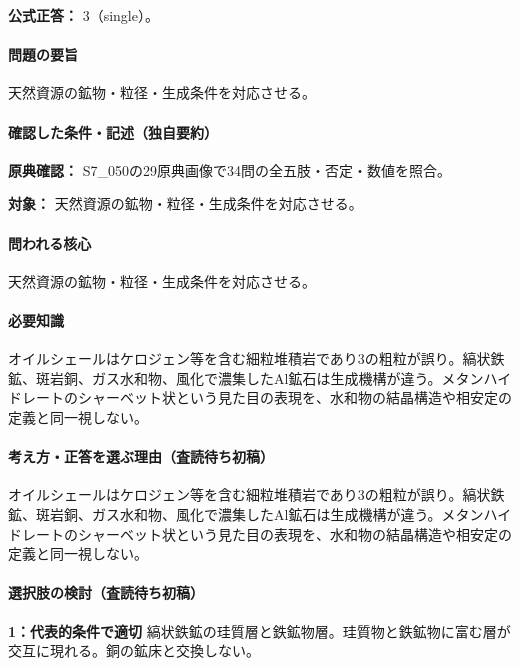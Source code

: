 \textbf{公式正答：} 3（single）。

\paragraph{問題の要旨} 天然資源の鉱物・粒径・生成条件を対応させる。

\paragraph{確認した条件・記述（独自要約）}\mbox{}\par

\noindent\textbf{原典確認：} S7\_050の29原典画像で34問の全五肢・否定・数値を照合。\par

\noindent\textbf{対象：} 天然資源の鉱物・粒径・生成条件を対応させる。\par

\paragraph{問われる核心} 天然資源の鉱物・粒径・生成条件を対応させる。

\paragraph{必要知識} オイルシェールはケロジェン等を含む細粒堆積岩であり3の粗粒が誤り。縞状鉄鉱、斑岩銅、ガス水和物、風化で濃集したAl鉱石は生成機構が違う。メタンハイドレートのシャーベット状という見た目の表現を、水和物の結晶構造や相安定の定義と同一視しない。

\paragraph{考え方・正答を選ぶ理由（査読待ち初稿）} オイルシェールはケロジェン等を含む細粒堆積岩であり3の粗粒が誤り。縞状鉄鉱、斑岩銅、ガス水和物、風化で濃集したAl鉱石は生成機構が違う。メタンハイドレートのシャーベット状という見た目の表現を、水和物の結晶構造や相安定の定義と同一視しない。

\paragraph{選択肢の検討（査読待ち初稿）}\mbox{}\par

\noindent\textbf{1：代表的条件で適切} 縞状鉄鉱の珪質層と鉄鉱物層。珪質物と鉄鉱物に富む層が交互に現れる。銅の鉱床と交換しない。\par

